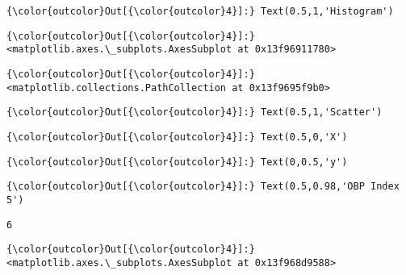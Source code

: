 \documentclass[11pt]{article}
\begin{document}
\begin{Verbatim}[commandchars=\\\{\}]
{\color{outcolor}Out[{\color{outcolor}4}]:} Text(0.5,1,'Histogram')
\end{Verbatim}
            
\begin{Verbatim}[commandchars=\\\{\}]
{\color{outcolor}Out[{\color{outcolor}4}]:} <matplotlib.axes.\_subplots.AxesSubplot at 0x13f96911780>
\end{Verbatim}
            
\begin{Verbatim}[commandchars=\\\{\}]
{\color{outcolor}Out[{\color{outcolor}4}]:} <matplotlib.collections.PathCollection at 0x13f9695f9b0>
\end{Verbatim}
            
\begin{Verbatim}[commandchars=\\\{\}]
{\color{outcolor}Out[{\color{outcolor}4}]:} Text(0.5,1,'Scatter')
\end{Verbatim}
            
\begin{Verbatim}[commandchars=\\\{\}]
{\color{outcolor}Out[{\color{outcolor}4}]:} Text(0.5,0,'X')
\end{Verbatim}
            
\begin{Verbatim}[commandchars=\\\{\}]
{\color{outcolor}Out[{\color{outcolor}4}]:} Text(0,0.5,'y')
\end{Verbatim}
            
\begin{Verbatim}[commandchars=\\\{\}]
{\color{outcolor}Out[{\color{outcolor}4}]:} Text(0.5,0.98,'OBP Index 5')
\end{Verbatim}
            
    \begin{Verbatim}[commandchars=\\\{\}]
6

    \end{Verbatim}

\begin{Verbatim}[commandchars=\\\{\}]
{\color{outcolor}Out[{\color{outcolor}4}]:} <matplotlib.axes.\_subplots.AxesSubplot at 0x13f968d9588>
\end{Verbatim}
            
\end{document}
